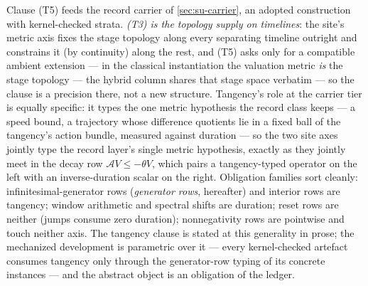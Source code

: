Clause (T5) feeds the record carrier of \autoref{sec:su-carrier}, an adopted
construction with kernel-checked strata. \emph{(T3) is the topology supply on
timelines}: the site's metric axis fixes the stage topology along every
separating timeline outright and constrains it (by continuity) along the
rest, and (T5) asks only for a compatible ambient extension --- in the
classical instantiation the valuation metric \emph{is} the stage topology
--- the hybrid column shares that stage space verbatim --- so the clause is
a precision there, not a new structure.
Tangency's role at the carrier tier is equally specific: it types the
one metric hypothesis the record class keeps --- a speed bound, a
trajectory whose difference quotients lie in a fixed ball of the
tangency's action bundle, measured against duration --- so the two
site axes jointly type the record layer's single metric
hypothesis, exactly as they jointly meet in the decay row
$\mathcal{A}V \le -\theta V$, which pairs a tangency-typed operator
on the left with an inverse-duration scalar on the right. Obligation
families sort cleanly: infinitesimal-generator rows
(\emph{generator rows}, hereafter) and interior rows are tangency; window
arithmetic and spectral shifts are duration; reset rows are neither
(jumps consume zero duration); nonnegativity rows are pointwise and
touch neither axis. The tangency clause is stated at this generality
in prose; the mechanized development is parametric over it --- every
kernel-checked artefact consumes tangency only through the
generator-row typing of its concrete instances --- and the abstract
object is an obligation of the ledger.

